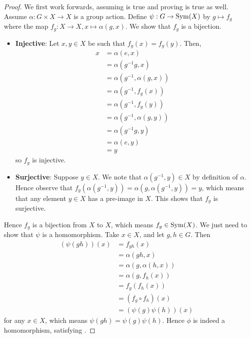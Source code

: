 \begin{proof}
    We first work forwards, assuming  is true and proving  is true as well. Assume $\alpha: G \times X \to X$ is a group action. Define $\psi: G \to \mathrm{Sym}(X)$ by $g \mapsto f_g$ where the map $f_g: X \to X, x \mapsto \alpha(g, x)$. We show that $f_g$ is a bijection.
    \begin{itemize}
        \item \textbf{Injective}: Let $x, y \in X$ be such that $f_g(x) = f_g(y)$. Then,
        \begin{align*}
            x &= \alpha(e, x)\\
            &= \alpha(g^{-1}g, x)\\
            &= \alpha(g^{-1}, \alpha(g, x))\\
            &= \alpha(g^{-1}, f_g(x))\\
            &= \alpha(g^{-1}, f_g(y))\\
            &= \alpha(g^{-1}, \alpha(g, y))\\
            &= \alpha(g^{-1}g, y)\\
            &= \alpha(e, y)\\
            &= y
        \end{align*}
        so $f_g$ is injective.

        \item \textbf{Surjective}: Suppose $y \in X$. We note that $\alpha(g^{-1}, y) \in X$ by definition of $\alpha$. Hence observe that $f_g(\alpha(g^{-1}, y)) = \alpha(g, \alpha(g^{-1}, y)) = y$, which means that any element $y \in X$ has a pre-image in $X$. This shows that $f_g$ is surjective.
    \end{itemize}

    Hence $f_g$ is a bijection from $X$ to $X$, which means $f_g \in \mathrm{Sym}(X)$. We just need to show that $\psi$ is a homomorphism. Take $x \in X$, and let $g, h \in G$. Then
    \begin{align*}
        (\psi(gh))(x) &= f_{gh}(x)\\
        &= \alpha(gh, x)\\
        &= \alpha(g, \alpha(h, x))\\
        &= \alpha(g, f_h(x))\\
        &= f_g(f_h(x))\\
        &= (f_g \circ f_h)(x)\\
        &= (\psi(g)\psi(h))(x)
    \end{align*}
    for any $x \in X$, which means $\psi(gh) = \psi(g)\psi(h)$. Hence $\phi$ is indeed a homomorphism, satisfying .


\end{proof}
